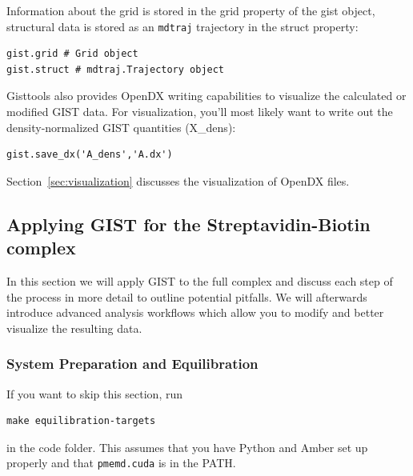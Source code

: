 \documentclass[9pt,tutorial]{livecoms}
\newcommand{\software}{\texttt}
\begin{document}
Information about the grid is stored in the grid property of the gist object, structural data is stored as an \software{mdtraj} trajectory in the struct property:
\begin{lstlisting}[style=python]
gist.grid # Grid object
gist.struct # mdtraj.Trajectory object
\end{lstlisting}
Gisttools also provides OpenDX writing capabilities to visualize the calculated or modified GIST data. For visualization, you'll most likely want to write out the density-normalized GIST quantities (X\_dens):

\begin{lstlisting}[style=python]
gist.save_dx('A_dens','A.dx')
\end{lstlisting}
Section~\ref{sec:visualization} discusses the visualization of OpenDX files.

\subsection{Applying GIST for the Streptavidin-Biotin complex}
In this section we will apply GIST to the full complex and discuss each step of the process in more detail to outline potential pitfalls. We will afterwards introduce advanced analysis workflows which allow you to modify and better visualize the resulting data.
\subsubsection{System Preparation and Equilibration}
If you want to skip this section, run 
\begin{lstlisting}[style=bash]
make equilibration-targets
\end{lstlisting}
in the code folder. This assumes that you have Python and Amber set up properly and that \software{pmemd.cuda} is in the PATH.
\end{document}
